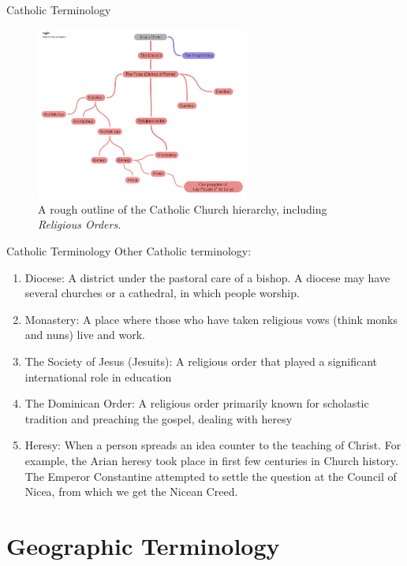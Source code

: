 \documentclass{beamer}
\begin{document}
\begin{frame}{Catholic Terminology}
\begin{figure}
\centering
\includegraphics[width=7cm]{figures/catholic.pdf}
\caption{A rough outline of the Catholic Church hierarchy, including \textit{Religious Orders.}}
\end{figure}
\end{frame}

\begin{frame}{Catholic Terminology}
\small
Other Catholic terminology:
\begin{enumerate}
\item Diocese: A district under the pastoral care of a bishop.  A diocese may have several churches or a cathedral, in which people worship.
\item Monastery: A place where those who have taken religious vows (think monks and nuns) live and work.
\item The Society of Jesus (Jesuits): A religious order that played a significant international role in education
\item The Dominican Order: A religious order primarily known for scholastic tradition and preaching the gospel, dealing with heresy
\item Heresy: When a person spreads an idea counter to the teaching of Christ.  For example, the Arian heresy took place in first few centuries in Church history.  The Emperor Constantine attempted to settle the question at the Council of Nicea, from which we get the Nicean Creed.
\end{enumerate}
\end{frame}

\section{Geographic Terminology}
\end{document}
